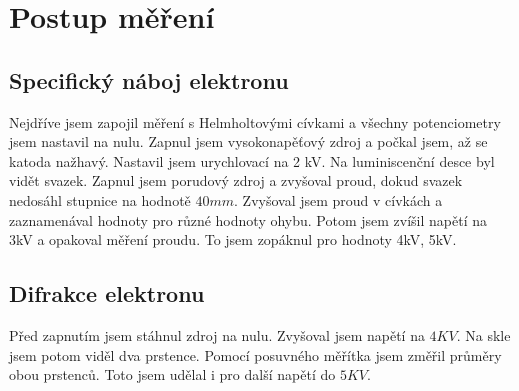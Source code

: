 \documentclass{article}
\begin{document}
\section{Postup měření}
\subsection{Specifický náboj elektronu}
Nejdříve jsem zapojil měření s Helmholtovými cívkami a všechny potenciometry jsem nastavil na nulu.
Zapnul jsem vysokonapěťový zdroj a počkal jsem, až se katoda nažhavý.
Nastavil jsem urychlovací na 2 kV. Na luminiscenční desce byl vidět svazek.
Zapnul jsem porudový zdroj a zvyšoval proud, dokud svazek nedosáhl stupnice na hodnotě $40 mm$.
Zvyšoval jsem proud v cívkách a zaznamenával hodnoty pro různé hodnoty ohybu.
Potom jsem zvíšil napětí na 3kV a opakoval měření proudu.
To jsem zopáknul pro hodnoty 4kV, 5kV.
\subsection{Difrakce elektronu}
Před zapnutím jsem stáhnul zdroj na nulu. Zvyšoval jsem napětí na $4KV$. Na skle jsem potom viděl
dva prstence. Pomocí posuvného měřítka jsem změřil průměry obou prstenců. Toto jsem udělal i pro další napětí do $5KV$.
\section{}
\section{}
\section{}
\section{}
\end{document}
